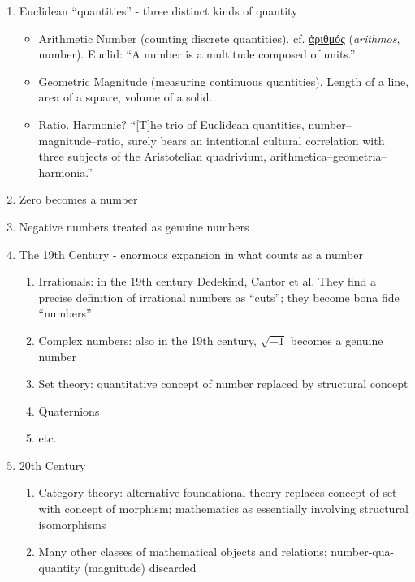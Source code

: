 \documentclass[11pt,twoside]{article}
\begin{document}
\begin{enumerate}
\item Euclidean ``quantities'' - three distinct kinds of quantity
\begin{itemize}
\item Arithmetic Number (counting discrete quantities).  cf. \href{http://www.perseus.tufts.edu/hopper/text?doc=Perseus\%3Atext\%3A1999.04.0057\%3Aentry\%3Da)riqmo\%2Fs}{ἀριθμός} (\textit{arithmos}, number).  Euclid: ``A number is a multitude composed of units.''
\item Geometric Magnitude (measuring continuous quantities).  Length of a line, area of a square, volume of a solid.
\item Ratio.  Harmonic?  ``[T]he trio of Euclidean quantities,
  number–magnitude–ratio, surely bears an intentional cultural
  correlation with three subjects of the Aristotelian quadrivium,
  arithmetica–geometria–harmonia.'' \cite[367]{grattan-guinness_numbers_1996}
\end{itemize}
\item Zero becomes a number
\item Negative numbers treated as genuine numbers
\item The 19th Century - enormous expansion in what counts as a number
\begin{enumerate}
\item Irrationals: in the 19th century Dedekind, Cantor et al.  They
  find a precise definition of irrational numbers as ``cuts''; they
  become bona fide ``numbers''
\item Complex numbers: also in the 19th century, $\sqrt{-1}$ becomes a genuine number
\item Set theory: quantitative concept of number replaced by structural concept
\item Quaternions
\item etc.
\end{enumerate}
\item 20th Century
\begin{enumerate}
\item Category theory: alternative foundational theory replaces concept of set with concept of morphism; mathematics as essentially involving structural isomorphisms
\item Many other classes of mathematical objects and relations; number-qua-quantity (magnitude) discarded
\end{enumerate}
\end{enumerate}
\end{document}
